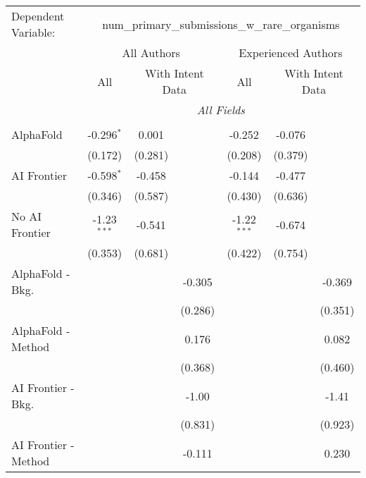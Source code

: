 \begingroup
\centering
\begin{tabular}{lcccccc}
   \tabularnewline \midrule \midrule
   Dependent Variable: & \multicolumn{6}{c}{num\_primary\_submissions\_w\_rare\_organisms}\\
 & \multicolumn{3}{c}{All Authors} & \multicolumn{3}{c}{Experienced Authors} \\
\cmidrule(lr){2-4} \cmidrule(lr){5-7}
 & \multicolumn{1}{c}{All} & \multicolumn{2}{c}{With Intent Data} & \multicolumn{1}{c}{All} & \multicolumn{2}{c}{With Intent Data} \\
\cmidrule(lr){2-2} \cmidrule(lr){3-4} \cmidrule(lr){5-5} \cmidrule(lr){6-7}
 & \multicolumn{6}{c}{\textit{All Fields}} \\ \\
   AlphaFold               & -0.296$^{*}$  & 0.001   &               & -0.252        & -0.076  &   \\   
                           & (0.172)       & (0.281) &               & (0.208)       & (0.379) &   \\   
   AI Frontier             & -0.598$^{*}$  & -0.458  &               & -0.144        & -0.477  &   \\   
                           & (0.346)       & (0.587) &               & (0.430)       & (0.636) &   \\   
   No AI Frontier          & -1.23$^{***}$ & -0.541  &               & -1.22$^{***}$ & -0.674  &   \\   
                           & (0.353)       & (0.681) &               & (0.422)       & (0.754) &   \\   
   AlphaFold - Bkg.        &               &         & -0.305        &               &         & -0.369\\   
                           &               &         & (0.286)       &               &         & (0.351)\\   
   AlphaFold - Method      &               &         & 0.176         &               &         & 0.082\\   
                           &               &         & (0.368)       &               &         & (0.460)\\   
   AI Frontier - Bkg.      &               &         & -1.00         &               &         & -1.41\\   
                           &               &         & (0.831)       &               &         & (0.923)\\   
   AI Frontier - Method    &               &         & -0.111        &               &         & 0.230\\   

\end{tabular}
